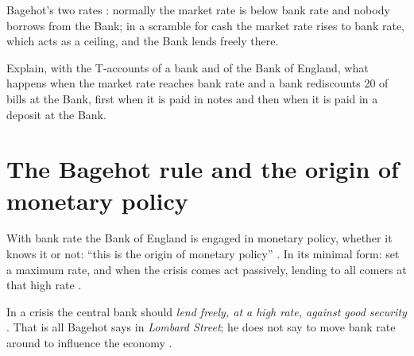 \begin{paracol}{2}
\begin{nfigure}
\caption{Bagehot's two rates : normally the market rate is below bank rate and nobody borrows from the Bank; in a scramble for cash the market rate rises to bank rate,
which acts as a ceiling, and the Bank lends freely there.}\label{fig:bg-rates}
\end{nfigure}

\begin{exercise}
Explain, with the T-accounts of a bank and of the Bank of England, what happens when the market rate reaches bank rate and a bank rediscounts 20 of bills at the Bank, first when it is paid in
notes and then when it is paid in a deposit at the Bank.
\end{exercise}

\section{The Bagehot rule and the origin of monetary policy}\label{sec:bg-rule}

With bank rate the Bank of England is engaged in monetary policy, whether it knows it or not: ``this is the origin of monetary policy'' . In its minimal
form: set a maximum rate, and when the crisis comes act passively, lending to all comers at that high rate .

\begin{proposition}\label{prop:bg-rule}
In a crisis the central bank should \emph{lend freely, at a high rate, against good security} . That is all Bagehot says in \emph{Lombard Street}; he does not say to move
bank rate around to influence the economy .
\end{proposition}


\end{paracol}
